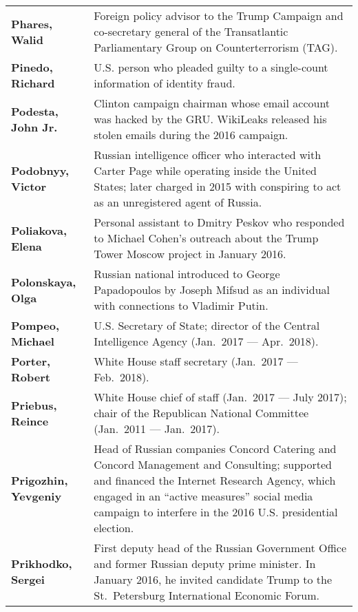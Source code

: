 \begin{longtable}{ p{} p{} }
    \textbf{Phares, Walid} & Foreign policy advisor to the Trump Campaign and co-secretary general of the Transatlantic Parliamentary Group on Counterterrorism (TAG). \\

    \textbf{Pinedo, Richard} & U.S. person who pleaded guilty to a single-count information of identity fraud. \\

    \textbf{Podesta, John Jr.} & Clinton campaign chairman whose email account was hacked by the GRU\null. WikiLeaks released his stolen emails during the 2016 campaign. \\

    \textbf{Podobnyy, Victor} & Russian intelligence officer who interacted with Carter Page while operating inside the United States; later charged in 2015 with conspiring to act as an unregistered agent of Russia. \\

    \textbf{Poliakova, Elena} & Personal assistant to Dmitry Peskov who responded to Michael Cohen's outreach about the Trump Tower Moscow project in January 2016. \\

    \textbf{Polonskaya, Olga} & Russian national introduced to George Papadopoulos by Joseph Mifsud as an individual with connections to Vladimir Putin. \\

    \textbf{Pompeo, Michael} & U.S. Secretary of State; director of the Central Intelligence Agency (Jan.~2017 — Apr.~2018). \\

    \textbf{Porter, Robert} & White House staff secretary (Jan.~2017 — Feb.~2018). \\

    \textbf{Priebus, Reince} & White House chief of staff (Jan.~2017 — July 2017); chair of the Republican National Committee (Jan.~2011 — Jan.~2017). \\

    \textbf{Prigozhin, Yevgeniy} & Head of Russian companies Concord Catering and Concord Management and Consulting; supported and financed the Internet Research Agency, which engaged in an ``active measures'' social media campaign to interfere in the 2016 U.S. presidential election. \\

    \textbf{Prikhodko, Sergei} & First deputy head of the Russian Government Office and former Russian deputy prime minister. In January 2016, he invited candidate Trump to the St.~Petersburg International Economic Forum. \\


\end{longtable}
